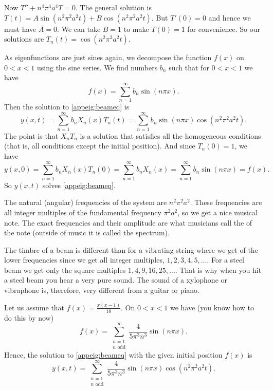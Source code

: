 Now 
$T'' + n^4 \pi^4 a^4 T = 0$.  The general solution is $T(t) =
A \sin (n^2 \pi^2 a^2 t) + B \cos (n^2 \pi^2 a^2 t)$.  But $T'(0) = 0$ and hence
we must have $A=0$.  We can take $B=1$ to make $T(0) = 1$ for convenience.
So our solutions are $T_n(t) = \cos (n^2 \pi^2 a^2 t)$.

As eigenfunctions are just sines again, we decompose the function
$f(x)$ on $0 < x < 1$ using the sine series.
We find numbers $b_n$ such that for
$0 < x < 1$ we have
\begin{equation*}
f(x) = \sum_{n=1}^\infty b_n \sin (n \pi x) .
\end{equation*}
Then the solution to \eqref{appeig:beameq} is
\begin{equation*}
y(x,t) = \sum_{n=1}^\infty b_n
X_n(x) T_n(t)
= \sum_{n=1}^\infty b_n
\sin (n \pi x)  \cos ( n^2 \pi^2 a^2 t ) .
\end{equation*}
The point is that $X_nT_n$ is a solution that satisfies all the homogeneous
conditions (that is, all conditions except the initial position).  And since
$T_n(0) = 1$, we have
\begin{equation*}
y(x,0) = \sum_{n=1}^\infty b_n X_n(x) T_n(0) = 
\sum_{n=1}^\infty b_n X_n(x) =
\sum_{n=1}^\infty b_n
\sin (n \pi x) = f(x) .
\end{equation*}
So $y(x,t)$ solves \eqref{appeig:beameq}.

The natural (angular) frequencies of the system are $n^2 \pi^2 a^2$.
These frequencies are all integer multiples of the fundamental frequency
$\pi^2 a^2$, so we get a nice musical note.  The exact frequencies
and their amplitude
are what musicians call the \emph{} of the note (outside
of music it is called the spectrum).

The timbre of a beam
is different than for a vibrating string where we get 
of the lower frequencies since we get all integer multiples,
$1,2,3,4,5,\ldots$.  For a steel beam we get
only the square multiples $1,4,9,16,25,\ldots$.  That is why when you hit a
steel beam you hear a very pure sound.  The sound of a
xylophone or vibraphone is, therefore, very different from a guitar or piano.

\begin{example}
Let us assume that $f(x) = \frac{x(x-1)}{10}$.  
On $0 < x < 1$ we have (you know how to do this by now)
\begin{equation*}
f(x) = \sum_{\substack{n=1\\n \text{~odd}}}^\infty \frac{4}{5\pi^3 n^3}
\sin (n \pi x) .
\end{equation*}
Hence, the solution to \eqref{appeig:beameq} with the given initial
position $f(x)$ is
\begin{equation*}
y(x,t) = \sum_{\substack{n=1\\n \text{~odd}}}^\infty \frac{4}{5\pi^3 n^3}
\sin (n \pi x) \cos ( n^2 \pi^2 a^2 t ) .
\end{equation*}
\end{example}

